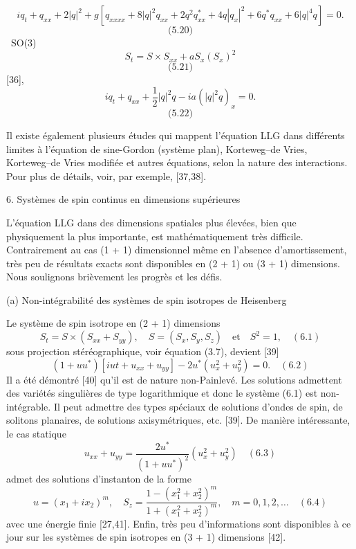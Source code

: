 \documentclass{article}
\begin{document}
   \[
   iq_t + q_{xx} + 2|q|^2 + g[q_{xxxx} + 8|q|^2q_{xx} + 2q^2q_{xx}^* + 4q|q_x|^2 + 6q^*q_{xx} + 6|q|^4q] = 0.
   \]
   \[
   \text{(5.20)}
   \]
    \ SO(3) \ \text{,}
   \[
   S_t = S \times S_{xx} + aS_x(S_x)^2
   \]
   \[
   \text{(5.21)}
   \]
    [36],
   \[
   iq_t + q_{xx} + \frac{1}{2}|q|^2q - ia(|q|^2q)_x = 0.
   \]
   \[
   \text{(5.22)}
   \]
   
   Il existe également plusieurs études qui mappent l'équation LLG dans différents limites
   à l'équation de sine-Gordon (système plan), Korteweg–de Vries, Korteweg–de Vries modifiée et autres équations, selon la nature des
   interactions. Pour plus de détails, voir, par exemple, [37,38].
   
   6. Systèmes de spin continus en dimensions supérieures
   
   L'équation LLG dans des dimensions spatiales plus élevées, bien que physiquement la plus
   importante, est mathématiquement très difficile. Contrairement au cas (1 + 1) dimensionnel
   même en l'absence d'amortissement, très peu de résultats exacts sont disponibles
   en (2 + 1) ou (3 + 1) dimensions. Nous soulignons brièvement les progrès
   et les défis.
   
   (a) Non-intégrabilité des systèmes de spin isotropes de Heisenberg
   
   Le système de spin isotrope en (2 + 1) dimensions
   \[
   S_t = S \times (S_{xx} + S_{yy}), \quad S = (S_x, S_y, S_z) \quad \text{et} \quad S^2 = 1, \quad (6.1)
   \]
   sous projection stéréographique, voir équation (3.7), devient [39]
   \[
   (1 + uu^*)[iut + u_{xx} + u_{yy}] - 2u^*(u_{x}^2 + u_{y}^2) = 0. \quad (6.2)
   \]
   Il a été démontré [40] qu'il est de nature non-Painlevé. Les solutions admettent
   des variétés singulières de type logarithmique et donc le système (6.1) est non-intégrable.
   Il peut admettre des types spéciaux de solutions d'ondes de spin, de solitons planaires, de solutions axisymétriques, etc. [39]. De manière intéressante, le cas statique
   \[
   u_{xx} + u_{yy} = \frac{2u^*}{(1 + uu^*)^2} (u_{x}^2 + u_{y}^2) \quad (6.3)
   \]
   admet des solutions d'instanton de la forme
   \[
   u = (x_{1} + ix_{2})^{m}, \quad S_z = \frac{1 - (x_{1}^2 + x_{2}^2)^{m}}{1 + (x_{1}^2 + x_{2}^2)^{m}}, \quad m = 0, 1, 2, \ldots \quad (6.4)
   \]
   avec une énergie finie [27,41]. Enfin, très peu d'informations sont disponibles à ce jour sur
   les systèmes de spin isotropes en (3 + 1) dimensions [42].
   
\end{document}
